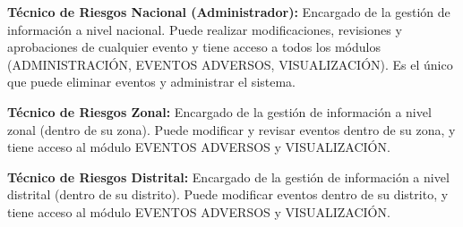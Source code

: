 \textbf{Técnico de Riesgos Nacional (Administrador):} Encargado de la gestión de información a nivel nacional. Puede realizar modificaciones, revisiones y aprobaciones de cualquier evento y tiene acceso a todos los módulos (ADMINISTRACIÓN, EVENTOS ADVERSOS, VISUALIZACIÓN). Es el único que puede eliminar eventos y administrar el sistema.

\textbf{Técnico de Riesgos Zonal:} Encargado de la gestión de información a nivel zonal (dentro de su zona). Puede modificar y revisar eventos dentro de su zona, y tiene acceso al módulo EVENTOS ADVERSOS y VISUALIZACIÓN.

\textbf{Técnico de Riesgos Distrital:} Encargado de la gestión de información a nivel distrital (dentro de su distrito). Puede modificar eventos dentro de su distrito, y tiene acceso al módulo EVENTOS ADVERSOS y VISUALIZACIÓN.
